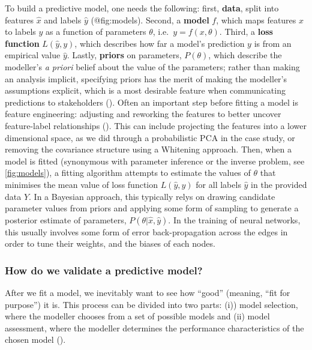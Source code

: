 \begin{refsection}
To build a predictive model, one needs the following: first,
\textbf{data}, split into features \(\hat{x}\) and labels \(\hat{y}\)
(@fig:models). Second, a \textbf{model} \(f\), which maps features \(x\)
to labels \(y\) as a function of parameters \(\theta\),
i.e.~\(y = f(x, \theta)\). Third, a \textbf{loss function}
\(L(\hat{y}, y)\), which describes how far a model's prediction \(y\) is
from an empirical value \(\hat{y}\). Lastly, \textbf{priors} on
parameters, \(P(\theta)\), which describe the modeller's \emph{a priori}
belief about the value of the parameters; rather than making an analysis
implicit, specifying priors has the merit of making the modeller's
assumptions explicit, which is a most desirable feature when
communicating predictions to stakeholders
(\cite{Spiegelhalter2000BayMet}). Often an important step before fitting a
model is feature engineering: adjusting and reworking the features to
better uncover feature-label relationships (\cite{Kuhn2019FeaEng}). This
can include projecting the features into a lower dimensional space, as
we did through a probabilistic PCA in the case study, or removing the
covariance structure using a Whitening approach. Then, when a model is
fitted (synonymous with parameter inference or the inverse problem, see
\autoref{fig:models}), a fitting algorithm attempts to estimate the values of
\(\theta\) that minimises the mean value of loss function
\(L(\hat{y},y)\) for all labels \(\hat{y}\) in the provided data \(Y\).
In a Bayesian approach, this typically relys on drawing candidate
parameter values from priors and applying some form of sampling to
generate a posterior estimate of parameters,
\(P(\theta | \hat{x}, \hat{y})\). In the training of neural networks,
this usually involves some form of error back-propagation across the
edges in order to tune their weights, and the biases of each nodes.

\subsubsection{How do we validate a predictive
model?}\label{how-do-we-validate-a-predictive-model}

After we fit a model, we inevitably want to see how ``good'' (meaning,
``fit for purpose'') it is. This process can be divided into two parts:
(i)) model selection, where the modeller chooses from a set of possible
models and (ii) model assessment, where the modeller determines the
performance characteristics of the chosen model (\cite{Hastie2009EleSta}).


\end{refsection}
